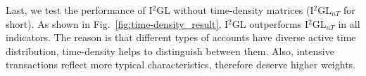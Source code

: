 Last, we test the performance of I$^2$GL without time-density matrices (I$^2$GL$_{nT}$ for short). As shown in Fig.~\ref{fig:time-density_result}, I$^2$GL outperforms I$^2$GL$_{nT}$ in all indicators. The reason is that different types of accounts have diverse active time distribution, time-density helps to distinguish between them. Also, intensive transactions reflect more typical characteristics, therefore deserve higher weights.



